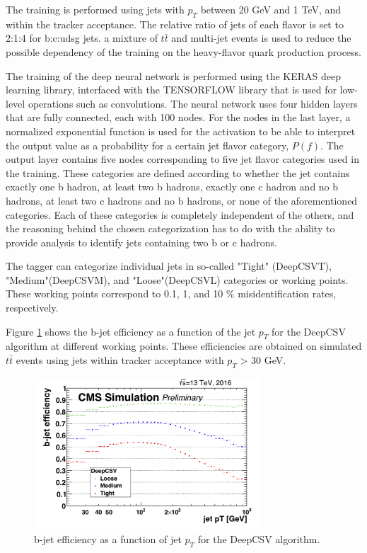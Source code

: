 The training is performed using jets with $p_{T}$ between 20 GeV and 1 TeV, and within the tracker acceptance. The relative ratio of jets of each flavor is set to 2:1:4 for b:c:udsg jets. a mixture of $t\bar{t}$ and multi-jet events is used to reduce the possible dependency of the training on the heavy-flavor quark production process.

The training of the deep neural network is performed using the KERAS\cite{chollet2015keras} deep learning library, interfaced with the TENSORFLOW\cite{tensorflow2015-whitepaper} library that is used for low-level operations such as convolutions. The neural network uses four hidden layers that are fully connected, each with 100 nodes. For the nodes in the last layer, a normalized exponential function is used for the activation to be able to interpret the output value as a probability for a certain jet flavor category, $P(f)$. The output layer contains five nodes corresponding to five jet flavor categories used in the training. These categories are defined according to whether the jet contains exactly one b hadron, at least two b hadrons, exactly one c hadron and no b hadrons, at least two c hadrons and no b hadrons, or none of the aforementioned categories. Each of these categories is completely independent of the others, and the reasoning behind the chosen categorization has to do with the ability to provide analysis to identify jets containing two b or c hadrons. 

The tagger can categorize individual jets in so-called "Tight" (DeepCSVT), "Medium"(DeepCSVM), and "Loose"(DeepCSVL) categories or working points. These working points correspond to 0.1, 1, and 10 $\%$ misidentification rates, respectively.

Figure \ref{fig:deepcsv} shows the b-jet efficiency as a function of the jet $p_{T}$ for the DeepCSV algorithm at different working points. These efficiencies are obtained on simulated $t\bar{t}$ events using jets within tracker acceptance with $p_{T}$ > 30 GeV.

\begin{figure}[h]
  	\label{fig:deepcsv}
 	\centering
 	\includegraphics[width=0.75\textwidth]{figures/effvspt_b_deep.png}
 	\singlespace
 	\caption{b-jet efficiency as a function of jet $p_{T}$ for the DeepCSV algorithm. \cite{Sirunyan_2018}}
 \end{figure}

